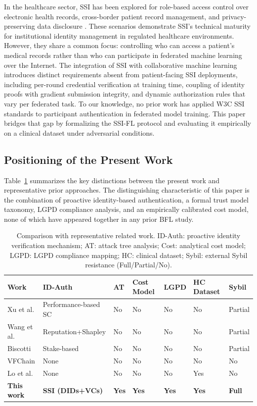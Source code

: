 \documentclass{sbc2023}
\begin{document}
In the healthcare sector, SSI has been explored for role-based access control over electronic health records, cross-border patient record management, and privacy-preserving data disclosure \citep{kubach2024taxonomy}. These scenarios demonstrate SSI's technical maturity for institutional identity management in regulated healthcare environments. However, they share a common focus: controlling who can access a patient's medical records rather than who can participate in federated machine learning over the Internet. The integration of SSI with collaborative machine learning introduces distinct requirements absent from patient-facing SSI deployments, including per-round credential verification at training time, coupling of identity proofs with gradient submission integrity, and dynamic authorization rules that vary per federated task. To our knowledge, no prior work has applied W3C SSI standards to participant authentication in federated model training. This paper bridges that gap by formalizing the SSI-FL protocol and evaluating it empirically on a clinical dataset under adversarial conditions.

\subsection{Positioning of the Present Work}

Table~\ref{tab:related} summarizes the key distinctions between the present work and representative prior approaches. The distinguishing characteristic of this paper is the combination of proactive identity-based authentication, a formal trust model taxonomy, LGPD compliance analysis, and an empirically calibrated cost model, none of which have appeared together in any prior BFL study.

\begin{table}[!ht]
\caption{Comparison with representative related work. ID-Auth: proactive identity verification mechanism; AT: attack tree analysis; Cost: analytical cost model; LGPD: LGPD compliance mapping; HC: clinical dataset; Sybil: external Sybil resistance (Full/Partial/No).}
\label{tab:related}
\centering
\begin{tabularx}{\textwidth}{lXXXXXX}
\toprule
\textbf{Work} & \textbf{ID-Auth} & \textbf{AT} & \textbf{Cost Model} & \textbf{LGPD} & \textbf{HC Dataset} & \textbf{Sybil} \\
\midrule
Xu et al. \citep{xu2021method} & Performance-based SC & No & No & No & No & Partial \\
Wang et al. \citep{wang2022blockchain} & Reputation+Shapley & No & No & No & No & Partial \\
Biscotti \citep{biscotti2021shayan} & Stake-based & No & No & No & No & Partial \\
VFChain \citep{peng2021vfchain} & None & No & No & No & No & No \\
Lo et al. \citep{lo2022trustworthy} & None & No & No & No & Yes & No \\
\textbf{This work} & \textbf{SSI (DIDs+VCs)} & \textbf{Yes} & \textbf{Yes} & \textbf{Yes} & \textbf{Yes} & \textbf{Full} \\
\bottomrule
\end{tabularx}
\end{table}
\end{document}

